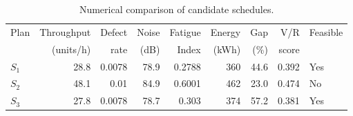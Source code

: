 \begin{table}[htbp]
\centering
\caption{Numerical comparison of candidate schedules.}
\label{tab:numerical-sim}
\small
\begin{tabular}{@{}lrrrrrrrl@{}}
\toprule
Plan & Throughput & Defect & Noise & Fatigue & Energy & Gap & V/R & Feasible \\
     & (units/h)  & rate   & (dB)  & Index   & (kWh)  & (\%) & score &         \\
\midrule
$S_{1}$ & 28.8 & 0.0078 & 78.9 & 0.2788 & 360 & 44.6 & 0.392 & Yes \\
$S_{2}$ & 48.1 & 0.01 & 84.9 & 0.6001 & 462 & 23.0 & 0.474 & No \\
$S_{3}$ & 27.8 & 0.0078 & 78.7 & 0.303 & 374 & 57.2 & 0.381 & Yes \\
\bottomrule
\end{tabular}
\end{table}
